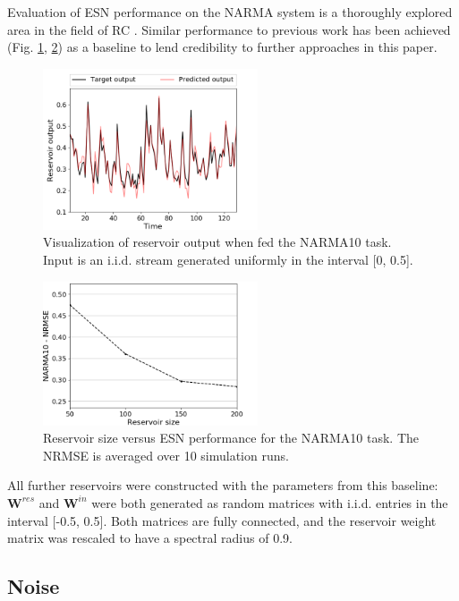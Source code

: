 Evaluation of ESN performance on the NARMA system is a thoroughly explored area
in the field of RC \cite{verstraeten_experimental_2007, rodan_minimum_2011,
jaeger_adaptive_nodate}. Similar performance to previous work has been achieved
(Fig. \ref{visualization}, \ref{performance}) as a baseline to lend credibility
to further approaches in this paper.

\begin{figure}[H]
  \centering
  \includegraphics[width=2.5in]{img/narma_visualization.png}
  \caption{
    Visualization of reservoir output when fed the NARMA10 task. Input is an
i.i.d. stream generated uniformly in the interval [0, 0.5].
  }
  \label{visualization}
\end{figure}

\begin{figure}[H]
  \centering
  \includegraphics[width=2.5in]{img/general_performance.png}
  \caption{
    Reservoir size versus ESN performance for the NARMA10 task. The NRMSE is
averaged over 10 simulation runs.
  }
  \label{performance}
\end{figure}

All further reservoirs were constructed with the parameters from this baseline:
$\mathbf{W}^{res}$ and $\mathbf{W}^{in}$ were both generated as random matrices
with i.i.d. entries in the interval [-0.5, 0.5]. Both matrices are fully
connected, and the reservoir weight matrix was rescaled to have a spectral
radius of 0.9.


\subsection{Noise}

